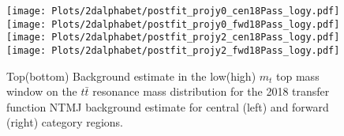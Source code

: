 \begin{figure}[!htbp]
	\begin{center}
		\texttt{[image: Plots/2dalphabet/postfit\_projy0\_cen18Pass\_logy.pdf]}
		\texttt{[image: Plots/2dalphabet/postfit\_projy0\_fwd18Pass\_logy.pdf]}\\
		\texttt{[image: Plots/2dalphabet/postfit\_projy2\_cen18Pass\_logy.pdf]}
		\texttt{[image: Plots/2dalphabet/postfit\_projy2\_fwd18Pass\_logy.pdf]}\\
		
		\caption{Top(bottom) Background estimate in the low(high) $m_{t}$ top mass window on the $t\bar{t}$ resonance mass distribution for the 2018 transfer function NTMJ background estimate for central (left) and forward (right) category regions.}
		\label{fig:closure_2018}
	\end{center}
\end{figure}






